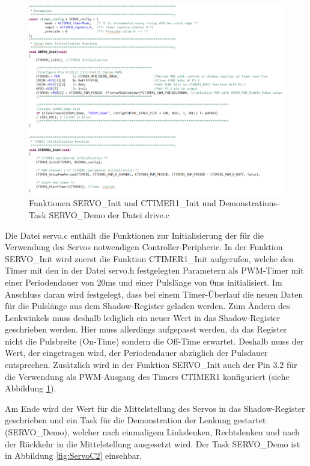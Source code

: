 \begin{figure}[H] %
\includegraphics[width=.95\textwidth]{sec5/images/ServoC1} 
\centering
\captionsetup{width=.95\textwidth}
\caption[Funktionen SERVO\_Init, CTIMER1\_Init und SERVO\_Demo der Datei \glqq{}drive.c\grqq{}]{Funktionen SERVO\_Init und CTIMER1\_Init und Demonstrations-Task SERVO\_Demo der Datei \glqq{}drive.c\grqq{}}\centering
\label{fig:ServoC1}
\end{figure}

Die Datei \glqq{}servo.c\grqq{} enthält die Funktionen zur Initialisierung der für die Verwendung des Servos notwendigen Controller-Peripherie. In der Funktion SERVO\_Init wird zuerst die Funktion CTIMER1\_Init aufgerufen, welche den Timer mit den in der Datei \glqq{}servo.h\grqq{} festgelegten Parametern als \ac{PWM}-Timer mit einer Periodendauer von 20ms und einer Pulslänge von 0ms initialisiert. Im Anschluss daran wird festgelegt, dass bei einem Timer-Überlauf die neuen Daten für die Pulslänge aus dem Shadow-Register geladen werden. Zum Ändern des Lenkwinkels muss deshalb lediglich ein neuer Wert in das Shadow-Register geschrieben werden. Hier muss allerdings aufgepasst werden, da das Register nicht die Pulsbreite (On-Time) sondern die Off-Time erwartet. Deshalb muss der Wert, der eingetragen wird, der Periodendauer abzüglich der Pulsdauer entsprechen. Zusätzlich wird in der Funktion SERVO\_Init auch der Pin 3.2 für die Verwendung als \ac{PWM}-Ausgang des Timers CTIMER1 konfiguriert (siehe Abbildung \ref{fig:ServoC1}).\vspace{11pt}

Am Ende wird der Wert für die Mittelstellung des Servos in das Shadow-Register geschrieben und ein Task für die Demonstration der Lenkung gestartet (SERVO\_Demo), welcher nach einmaligem Linkslenken, Rechtslenken und nach der Rückkehr in die Mittelstellung ausgesetzt wird. Der Task \glqq{}SERVO\_Demo\grqq{} ist in Abbildung \ref{fig:ServoC2} einsehbar.

